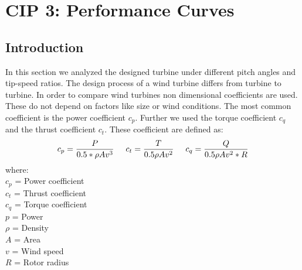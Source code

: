 \documentclass[10pt]{article}
\begin{document}
\newpage
\section{CIP 3: Performance Curves}
\subsection{Introduction}
In this section we analyzed the designed turbine under different pitch angles and tip-speed ratios. The design process of a wind turbine differs from turbine to turbine. In order to compare wind turbines non dimensional coefficients are used. These do not depend on factors like size or wind conditions. The most common coefficient is the power coefficient $c_p$. Further we used the torque coefficient $c_q$ and the thrust coefficient $c_t$.
These coefficient are defined as:
\begin{align*}
c_p = \frac{P}{0.5 *\rho A v^3}\hspace{0.5cm}c_t =  \frac{T}{0.5\rho A v^2}\hspace{0.5cm}c_q = \frac{Q}{0.5\rho A v^2*R}\\
\end{align*}
where:\\
$c_p$ = Power coefficient\\
$c_t$ = Thrust coefficient\\
$c_q$ = Torque coefficient\\
$p$   = Power\\
$\rho$ = Density\\
$A$    = Area\\
$v$	   = Wind speed\\
$R$		= Rotor radius
\end{document}
